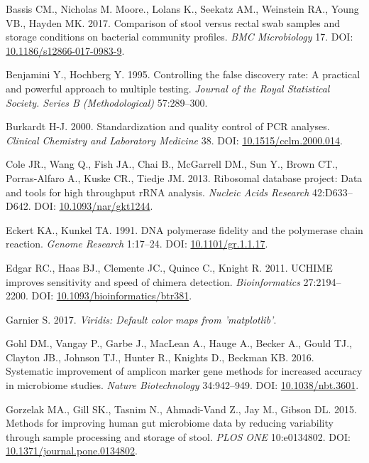 \documentclass[12pt,]{article}
\begin{document}
\hypertarget{ref-storage_Bassis_2017}{}
Bassis CM., Nicholas M. Moore., Lolans K., Seekatz AM., Weinstein RA.,
Young VB., Hayden MK. 2017. Comparison of stool versus rectal swab
samples and storage conditions on bacterial community profiles.
\emph{BMC Microbiology} 17. DOI:
\href{https://doi.org/10.1186/s12866-017-0983-9}{10.1186/s12866-017-0983-9}.

\hypertarget{ref-benjamini_controlling_1995}{}
Benjamini Y., Hochberg Y. 1995. Controlling the false discovery rate: A
practical and powerful approach to multiple testing. \emph{Journal of
the Royal Statistical Society. Series B (Methodological)} 57:289--300.

\hypertarget{ref-Burkardt2000}{}
Burkardt H-J. 2000. Standardization and quality control of PCR analyses.
\emph{Clinical Chemistry and Laboratory Medicine} 38. DOI:
\href{https://doi.org/10.1515/cclm.2000.014}{10.1515/cclm.2000.014}.

\hypertarget{ref-rdp_Cole_2013}{}
Cole JR., Wang Q., Fish JA., Chai B., McGarrell DM., Sun Y., Brown CT.,
Porras-Alfaro A., Kuske CR., Tiedje JM. 2013. Ribosomal database
project: Data and tools for high throughput rRNA analysis. \emph{Nucleic
Acids Research} 42:D633--D642. DOI:
\href{https://doi.org/10.1093/nar/gkt1244}{10.1093/nar/gkt1244}.

\hypertarget{ref-Eckert1991}{}
Eckert KA., Kunkel TA. 1991. DNA polymerase fidelity and the polymerase
chain reaction. \emph{Genome Research} 1:17--24. DOI:
\href{https://doi.org/10.1101/gr.1.1.17}{10.1101/gr.1.1.17}.

\hypertarget{ref-uchime_Edgar_2011}{}
Edgar RC., Haas BJ., Clemente JC., Quince C., Knight R. 2011. UCHIME
improves sensitivity and speed of chimera detection.
\emph{Bioinformatics} 27:2194--2200. DOI:
\href{https://doi.org/10.1093/bioinformatics/btr381}{10.1093/bioinformatics/btr381}.

\hypertarget{ref-viridis_citation_2017}{}
Garnier S. 2017. \emph{Viridis: Default color maps from 'matplotlib'}.

\hypertarget{ref-taq_Gohl_2016}{}
Gohl DM., Vangay P., Garbe J., MacLean A., Hauge A., Becker A., Gould
TJ., Clayton JB., Johnson TJ., Hunter R., Knights D., Beckman KB. 2016.
Systematic improvement of amplicon marker gene methods for increased
accuracy in microbiome studies. \emph{Nature Biotechnology} 34:942--949.
DOI: \href{https://doi.org/10.1038/nbt.3601}{10.1038/nbt.3601}.

\hypertarget{ref-Gorzelak2015}{}
Gorzelak MA., Gill SK., Tasnim N., Ahmadi-Vand Z., Jay M., Gibson DL.
2015. Methods for improving human gut microbiome data by reducing
variability through sample processing and storage of stool. \emph{PLOS
ONE} 10:e0134802. DOI:
\href{https://doi.org/10.1371/journal.pone.0134802}{10.1371/journal.pone.0134802}.
\end{document}
